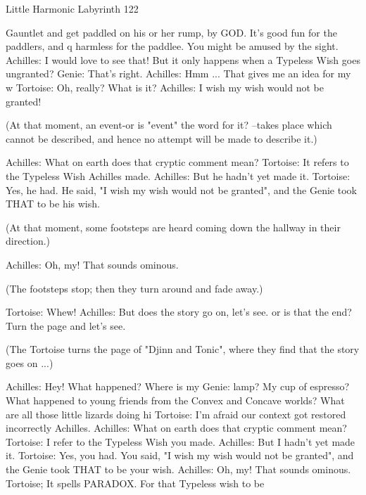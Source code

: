 Little Harmonic Labyrinth                                                            122

          Gauntlet and get paddled on his or her rump, by GOD. It's good fun for the
                 paddlers, and q harmless for the paddlee. You might be amused by the
                 sight.
          Achilles: I would love to see that! But it only happens when a Typeless Wish
                 goes ungranted?
          Genie: That's right.
          Achilles: Hmm ... That gives me an idea for my w Tortoise: Oh, really? What
                 is it? Achilles: I wish my wish would not be granted!

             (At that moment, an event-or is "event" the word for it? --takes place which
             cannot be described, and hence no attempt will be made to describe it.)

          Achilles: What on earth does that cryptic comment mean?
          Tortoise: It refers to the Typeless Wish Achilles made.
          Achilles: But he hadn't yet made it.
          Tortoise: Yes, he had. He said, "I wish my wish would not be
          granted", and the Genie took THAT to be his wish.

             (At that moment, some footsteps are heard coming down the hallway in
             their direction.)

          Achilles: Oh, my! That sounds ominous.

              (The footsteps stop; then they turn around and fade away.)

          Tortoise: Whew!
          Achilles: But does the story go on, let's see. or is that the end? Turn the page
                 and let’s see.

             (The Tortoise turns the page of "Djinn and Tonic", where they find that the
             story goes on ...)

               Achilles: Hey! What happened? Where is my Genie: lamp? My cup of
                      espresso? What happened to young friends from the Convex and
                      Concave worlds? What are all those little lizards doing hi
               Tortoise: I'm afraid our context got restored incorrectly Achilles.
               Achilles: What on earth does that cryptic comment mean?
               Tortoise: I refer to the Typeless Wish you made.
               Achilles: But I hadn't yet made it.
               Tortoise: Yes, you had. You said, "I wish my wish would not be
                      granted", and the Genie took THAT to be your wish.
               Achilles: Oh, my! That sounds ominous.
               Tortoise; It spells PARADOX. For that Typeless wish to be




